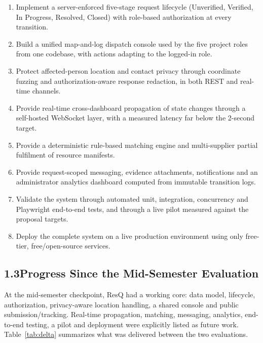 \documentclass[11pt,a4paper]{article}
\begin{document}
\begin{enumerate}
\item Implement a server-enforced five-stage request lifecycle (Unverified, Verified, In Progress, Resolved, Closed) with role-based authorization at every transition.
\item Build a unified map-and-log dispatch console used by the five project roles from one codebase, with actions adapting to the logged-in role.
\item Protect affected-person location and contact privacy through coordinate fuzzing and authorization-aware response redaction, in both REST and real-time channels.
\item Provide real-time cross-dashboard propagation of state changes through a self-hosted WebSocket layer, with a measured latency far below the 2-second target.
\item Provide a deterministic rule-based matching engine and multi-supplier partial fulfilment of resource manifests.
\item Provide request-scoped messaging, evidence attachments, notifications and an administrator analytics dashboard computed from immutable transition logs.
\item Validate the system through automated unit, integration, concurrency and Playwright end-to-end tests, and through a live pilot measured against the proposal targets.
\item Deploy the complete system on a live production environment using only free-tier, free/open-source services.
\end{enumerate}

\subsection{1.3\quad Progress Since the Mid-Semester Evaluation}\label{s13}

At the mid-semester checkpoint, ResQ had a working core: data model, lifecycle, authorization, privacy-aware location handling, a shared console and public submission/tracking. Real-time propagation, matching, messaging, analytics, end-to-end testing, a pilot and deployment were explicitly listed as future work. Table~\ref{tab:delta} summarizes what was delivered between the two evaluations.
\end{document}
